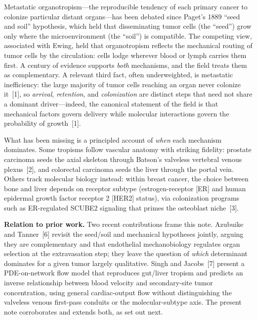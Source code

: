 \documentclass[11pt]{article}
\begin{document}
Metastatic organotropism---the reproducible tendency of each primary cancer to
colonize particular distant organs---has been debated since Paget's 1889
``seed and soil'' hypothesis, which held that disseminating tumor cells (the
``seed'') grow only where the microenvironment (the ``soil'') is compatible. The
competing view, associated with Ewing, held that organotropism reflects the
mechanical routing of tumor cells by the circulation: cells lodge wherever blood
or lymph carries them first. A century of evidence supports \emph{both}
mechanisms, and the field treats them as complementary. A relevant third fact,
often underweighted, is metastatic inefficiency: the large majority of tumor
cells reaching an organ never colonize it~[1], so \emph{arrival},
\emph{retention}, and \emph{colonization} are distinct steps that need not share a
dominant driver---indeed, the canonical statement of the field is that mechanical
factors govern delivery while molecular interactions govern the probability of
growth~[1].

What has been missing is a principled account of \emph{when} each mechanism
dominates. Some tropisms follow vascular anatomy with striking fidelity: prostate
carcinoma seeds the axial skeleton through Batson's valveless vertebral venous
plexus~[2], and colorectal carcinoma seeds the liver through the portal vein. Others
track molecular biology instead: within breast cancer, the choice between bone
and liver depends on receptor subtype (estrogen-receptor [ER] and human epidermal
growth factor receptor 2 [HER2] status), via colonization programs such as
ER-regulated SCUBE2 signaling that primes the osteoblast niche~[3].

\textbf{Relation to prior work.} Two recent contributions frame this note.
Azubuike and Tanner~[6] revisit the seed/soil and mechanical hypotheses jointly,
arguing they are complementary and that endothelial mechanobiology regulates organ
selection at the extravasation step; they leave the question of \emph{which}
determinant dominates for a given tumor largely qualitative. Singh and Jacobs~[7]
present a PDE-on-network flow model that reproduces gut/liver tropism and predicts an
inverse relationship between blood velocity and secondary-site tumor concentration,
using general cardiac-output flow without distinguishing the valveless venous
first-pass conduits or the molecular-subtype axis. The present note corroborates and
extends both, as set out next.
\end{document}
